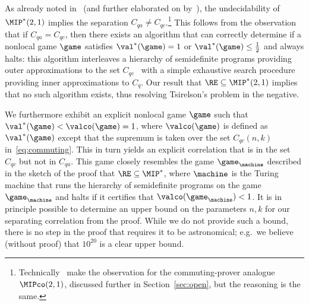 As already noted in~\cite{fritz2014can} (and further elaborated on by~\cite{fitzsimons2018quantum}), the undecidability of $\MIP^*(2,1)$ implies the separation $C_{qa} \neq C_{qc}$.\footnote{Technically~\cite{fritz2014can} make the observation for the commuting-prover analogue $\MIPco(2,1)$, discussed further in Section~\ref{sec:open}, but the reasoning is the same.} This follows from the observation that if $C_{qa} = C_{qc}$, then there exists an algorithm that can correctly determine if a nonlocal game $\game$ satisfies $\val^*(\game)=1$ or $\val^*(\game)\leq  \frac{1}{2}$ and always halts: this algorithm interleaves a hierarchy of semidefinite programs providing outer approximations to the set $C_{qc}$~\cite{navascues2008convergent,doherty2008quantum} with a simple exhaustive search procedure providing inner approximations to $C_{q}$. Our result that $\RE \subseteq \MIP^*(2,1)$ implies that no such algorithm exists, thus resolving Tsirelson's problem in the negative.

We furthermore exhibit an explicit nonlocal game $\game$ such that $\val^*(\game) < \valco(\game) = 1$, where $\valco(\game)$ is defined as $\val^*(\game)$ except that the supremum is taken over the set $C_{qc}(n,k)$ in~\eqref{eq:commuting}. This in turn yields an explicit correlation that is in the set $C_{qc}$ but not in $C_{qa}$. 
This game closely resembles the game $\game_\machine$ described in the sketch of the proof that $\RE \subseteq \MIP^*$, where $\machine$ is the Turing machine that runs the hierarchy of semidefinite programs on the game $\game_\machine$ and halts if it certifies that $\valco(\game_\machine) < 1$. It is in principle possible to determine an upper bound on the parameters $n,k$ for our separating correlation from the proof. While we do not provide such a bound, there is no step in the proof that requires it to be astronomical; e.g.\ we believe (without proof) that $10^{20}$ is a clear upper bound.

